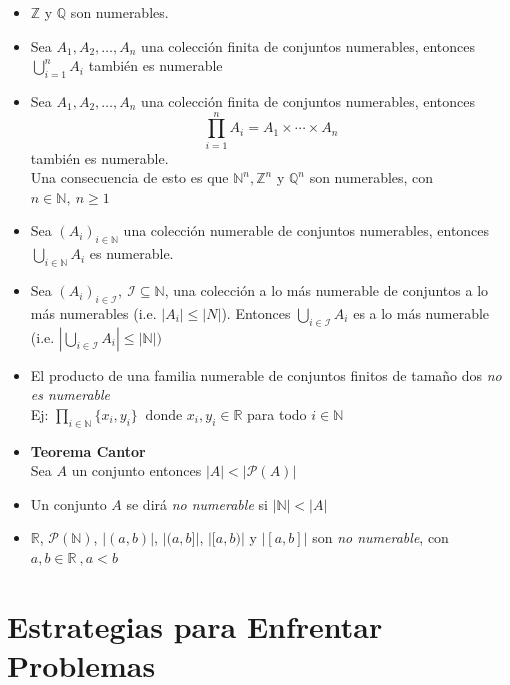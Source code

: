 \documentclass[letterpaper,11pt]{article}
\newcommand{\Q}{\mathbb Q}
\newcommand{\R}{\mathbb R}
\newcommand{\N}{\mathbb N}
\newcommand{\Z}{\mathbb Z}
\theoremstyle{plain}
\begin{document}
\begin{framed}
\begin{multicols}{2}
\begin{itemize}
    \item $\Z$ y $\Q$ son numerables.
    
    \item Sea $A_1,A_2,\dots,A_n$ una colección finita de conjuntos numerables, entonces $\displaystyle \bigcup_{i=1}^{n}A_i$ también es numerable
    
    \item Sea $A_1,A_2,\dots,A_n$ una colección finita de conjuntos numerables, entonces $$\displaystyle \prod_{i=1}^{n}A_i= A_1 \times \cdots \times A_n$$ también es numerable.\\
        Una consecuencia de esto es que $\N^n , \Z^n$ y $\Q^n$ son numerables, con $n \in \N, ~ n\geq 1$
    
    \item Sea $(A_i)_{i\in \N}$ una colección numerable de conjuntos numerables, entonces $\displaystyle \bigcup_{i\in \N}A_i$ es numerable. 
    
    \item Sea $(A_i)_{i\in \mathcal{I}},~ \mathcal{I} \subseteq \N$, una colección a lo más numerable de conjuntos a lo más numerables (i.e. $|A_i|\leq |N|$). Entonces
    $\displaystyle \bigcup_{i\in \mathcal{I}}A_i$ es a lo más numerable (i.e. $\displaystyle |\bigcup_{i\in \mathcal{I}}A_i|\leq |\N|)$
    
    \item El producto de una familia numerable de conjuntos finitos de tamaño dos \emph{no es numerable}\\
    Ej: $\displaystyle \prod_{i \in \N} \{x_i,y_i\} ~ \text{ donde } x_i,y_i \in \R$ para todo $i \in \N$
    \item \textbf{Teorema Cantor}\\Sea $A$ un conjunto entonces $|A|<|\mathcal{P}(A)|$
    \item Un conjunto $A$ se dirá \emph{no numerable}  si $|\N|<|A|$
    \item $\R$, $\mathcal{P}(\N)$, $|(a,b)|$, $|(a,b]|$, $|[a,b)|$ y $|[a,b]|$    son \emph{no numerable}, con $a,b \in \R ~,a<b$ 
\end{itemize}
\end{multicols}
\end{framed}

\tableofcontents

\newpage 
\section{Estrategias para Enfrentar Problemas}
\end{document}
